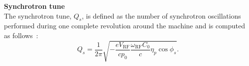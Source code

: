 \textbf{Synchrotron tune}\\
The synchrotron tune, $Q_s$, is defined as the number of synchrotron oscillations performed during one complete revolution around the machine and is computed as follows~\cite{wolski2014}: %
\begin{equation}\label{eq:Qs} 
    Q_s = \frac{1}{2\pi}\sqrt{-\frac{e V_\mathrm{RF}}{c p_0} \frac{\omega_\mathrm{RF} C_0}{c} \eta_p \cos{\phi_s}}.
\end{equation}



 






